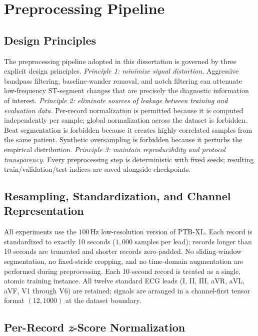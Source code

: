 \section{Preprocessing Pipeline}

\subsection{Design Principles}

The preprocessing pipeline adopted in this dissertation is governed by three explicit design principles. \textit{Principle 1: minimize signal distortion.} Aggressive bandpass filtering, baseline-wander removal, and notch filtering can attenuate low-frequency ST-segment changes that are precisely the diagnostic information of interest. \textit{Principle 2: eliminate sources of leakage between training and evaluation data.} Per-record normalization is permitted because it is computed independently per sample; global normalization across the dataset is forbidden. Beat segmentation is forbidden because it creates highly correlated samples from the same patient. Synthetic oversampling is forbidden because it perturbs the empirical distribution. \textit{Principle 3: maintain reproducibility and protocol transparency.} Every preprocessing step is deterministic with fixed seeds; resulting train/validation/test indices are saved alongside checkpoints.

\subsection{Resampling, Standardization, and Channel Representation}

All experiments use the $100$\,Hz low-resolution version of PTB-XL. Each record is standardized to exactly 10 seconds ($1{,}000$ samples per lead); records longer than 10 seconds are truncated and shorter records zero-padded. No sliding-window segmentation, no fixed-stride cropping, and no time-domain augmentation are performed during preprocessing. Each 10-second record is treated as a single, atomic training instance. All twelve standard ECG leads (I, II, III, aVR, aVL, aVF, V1 through V6) are retained; signals are arranged in a channel-first tensor format $(12, 1000)$ at the dataset boundary.

\subsection{Per-Record \emph{z}-Score Normalization}

